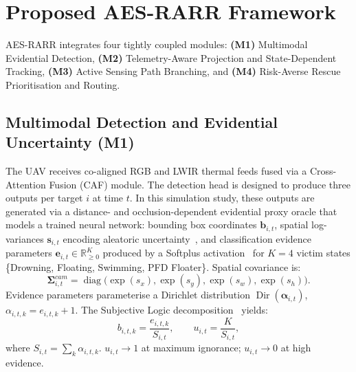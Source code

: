 \documentclass[11pt,a4paper]{article}
\begin{document}
\section{Proposed AES-RARR Framework}

AES-RARR integrates four tightly coupled modules:
\textbf{(M1)} Multimodal Evidential Detection,
\textbf{(M2)} Telemetry-Aware Projection and State-Dependent Tracking,
\textbf{(M3)} Active Sensing Path Branching, and
\textbf{(M4)} Risk-Averse Rescue Prioritisation and Routing.

\subsection{Multimodal Detection and Evidential Uncertainty (M1)}

The UAV receives co-aligned RGB and LWIR thermal feeds fused via a
Cross-Attention Fusion (CAF) module.
The detection head is designed to produce three outputs per target $i$ at time $t$. In this simulation study, these outputs are generated via a distance- and occlusion-dependent evidential proxy oracle that models a trained neural network:
bounding box coordinates $\mathbf{b}_{i,t}$,
spatial log-variances $\mathbf{s}_{i,t}$ encoding aleatoric
uncertainty~\cite{kendall2017}, and classification evidence parameters
$\mathbf{e}_{i,t} \in \mathbb{R}^K_{\geq 0}$ produced by a
Softplus activation~\cite{sensoy2018}
for $K = 4$ victim states \{Drowning, Floating, Swimming, PFD Floater\}.
Spatial covariance is:
\begin{equation}
  \boldsymbol{\Sigma}^{cam}_{i,t}
  = \operatorname{diag}\!\bigl(\exp(s_x),\exp(s_y),\exp(s_w),\exp(s_h)\bigr).
\end{equation}
Evidence parameters parameterise a Dirichlet distribution
$\operatorname{Dir}(\boldsymbol{\alpha}_{i,t})$,
$\alpha_{i,t,k} = e_{i,t,k} + 1$.
The Subjective Logic decomposition~\cite{sensoy2018} yields:
\begin{equation}
  b_{i,t,k} = \frac{e_{i,t,k}}{S_{i,t}},
  \qquad
  u_{i,t} = \frac{K}{S_{i,t}},
  \label{eq:edl}
\end{equation}
where $S_{i,t} = \sum_k \alpha_{i,t,k}$.
$u_{i,t} \to 1$ at maximum ignorance; $u_{i,t} \to 0$ at high evidence.

\end{document}
